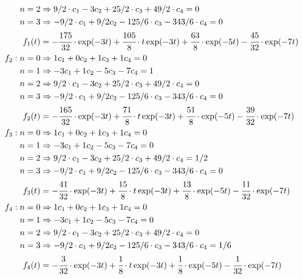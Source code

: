 \documentclass[12pt,a4paper]{article}
\begin{document}
\begin{align}
n = 2 &\Rightarrow 9/2\cdot c_1 - 3 c_2 + 25/2\cdot c_3 + 49/2\cdot c_4 = 0 \\
n = 3 &\Rightarrow - 9/2\cdot c_1 + 9/2 c_2 - 125/6\cdot c_3 - 343/6\cdot c_4 = 0 \\
f_1(t) &= - \cfrac{175}{32}\cdot \exp(-3t) + \cfrac{105}{8}\cdot t \exp(-3t) + \cfrac{63}{8}\cdot \exp(-5t) - \cfrac{45}{32}\cdot \exp(-7t) \\
f_2: n = 0 &\Rightarrow 1 c_1 + 0 c_2 + 1 c_3 + 1 c_4 = 0 \\
n = 1 &\Rightarrow -3 c_1 + 1 c_2 - 5 c_3 - 7 c_4 = 1  \\
n = 2 &\Rightarrow 9/2\cdot c_1 - 3 c_2 + 25/2\cdot c_3 + 49/2\cdot c_4 = 0 \\
n = 3 &\Rightarrow - 9/2\cdot c_1 + 9/2 c_2 - 125/6\cdot c_3 - 343/6\cdot c_4 = 0 \\
f_2(t) &= - \cfrac{165}{32}\cdot \exp(-3t) + \cfrac{71}{8}\cdot t \exp(-3t) + \cfrac{51}{8}\cdot \exp(-5t) - \cfrac{39}{32}\cdot \exp(-7t) \\
f_3: n = 0 &\Rightarrow 1 c_1 + 0 c_2 + 1 c_3 + 1 c_4 = 0 \\
n = 1 &\Rightarrow -3 c_1 + 1 c_2 - 5 c_3 - 7 c_4 = 0  \\
n = 2 &\Rightarrow 9/2\cdot c_1 - 3 c_2 + 25/2\cdot c_3 + 49/2\cdot c_4 = 1/2 \\
n = 3 &\Rightarrow - 9/2\cdot c_1 + 9/2 c_2 - 125/6\cdot c_3 - 343/6\cdot c_4 = 0 \\
f_3(t) &= - \cfrac{41}{32}\cdot \exp(-3t) + \cfrac{15}{8}\cdot t \exp(-3t) + \cfrac{13}{8}\cdot \exp(-5t) - \cfrac{11}{32}\cdot \exp(-7t) \\
f_4: n = 0 &\Rightarrow 1 c_1 + 0 c_2 + 1 c_3 + 1 c_4 = 0\\
n = 1 &\Rightarrow -3 c_1 + 1 c_2 - 5 c_3 - 7 c_4 = 0  \\
n = 2 &\Rightarrow 9/2\cdot c_1 - 3 c_2 + 25/2\cdot c_3 + 49/2\cdot c_4 = 0 \\
n = 3 &\Rightarrow - 9/2\cdot c_1 + 9/2 c_2 - 125/6\cdot c_3 - 343/6\cdot c_4 = 1/6 \\
f_4(t) &= - \cfrac{3}{32}\cdot \exp(-3t) + \cfrac{1}{8}\cdot t \exp(-3t) + \cfrac{1}{8}\cdot \exp(-5t) - \cfrac{1}{32}\cdot \exp(-7t)
\end{align}
\end{document}
